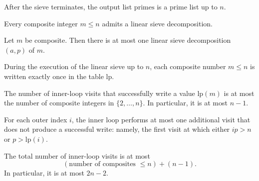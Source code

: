\begin{theorem}
    \label{thm:prime_list_correct}
    After the sieve terminates, the output list $\mathrm{primes}$ is a prime list up to $n$.
\end{theorem}

\begin{lemma}
    \label{lem:linear_decomp_exists}
    Every composite integer $m\le n$ admits a linear sieve decomposition.
\end{lemma}

\begin{lemma}
    \label{lem:linear_decomp_unique}
    Let $m$ be composite.
    Then there is at most one linear sieve decomposition $(a,p)$ of $m$.
\end{lemma}

\begin{theorem}
    \label{thm:every_composite_once}
    During the execution of the linear sieve up to $n$, each composite number $m\le n$ is written exactly once in the table $\mathrm{lp}$.
\end{theorem}

\begin{lemma}
    \label{lem:successful_visits_bound}
    The number of inner-loop visits that successfully write a value $\mathrm{lp}(m)$ is at most the number of composite integers in $\{2,\dots,n\}$.
    In particular, it is at most $n-1$.
\end{lemma}

\begin{lemma}
    \label{lem:extra_visit_bound}
    For each outer index $i$, the inner loop performs at most one additional visit that does not produce a successful write:
    namely, the first visit at which either $ip>n$ or $p>\mathrm{lp}(i)$.
\end{lemma}

\begin{lemma}
    \label{lem:all_inner_visits_bound}
    The total number of inner-loop visits is at most
    \[
        (\text{number of composites }\le n) + (n-1).
    \]
    In particular, it is at most $2n-2$.
\end{lemma}

